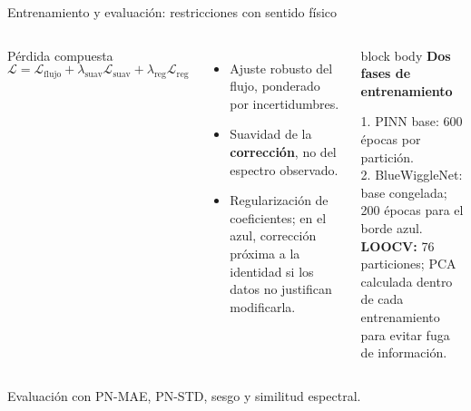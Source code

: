 \documentclass[aspectratio=169,10pt]{beamer}
\begin{document}
\begin{frame}{Entrenamiento y evaluación: restricciones con sentido físico}
  \begin{columns}[T,onlytextwidth]
      \begin{block}{Pérdida compuesta}
        \[
          \mathcal{L}=
          \mathcal{L}_{\mathrm{flujo}}+
          \lambda_{\mathrm{suav}}\mathcal{L}_{\mathrm{suav}}+
          \lambda_{\mathrm{reg}}\mathcal{L}_{\mathrm{reg}}
        \]
      \end{block}
      \begin{itemize}
        \item Ajuste robusto del flujo, ponderado por incertidumbres.
        \item Suavidad de la \textbf{corrección}, no del espectro observado.
        \item Regularización de coeficientes; en el azul, corrección próxima a
              la identidad si los datos no justifican modificarla.
      \end{itemize}
      \begin{beamercolorbox}[wd=\linewidth,sep=0.85em,rounded=true]{block body}
        {\color{ULLNavy}\bfseries Dos fases de entrenamiento}\par
        \small
        1. PINN base: 600 épocas por partición.\\[0.35em]
        2. BlueWiggleNet: base congelada; 200 épocas para el borde azul.\\[0.55em]
        \textbf{LOOCV:} 76 particiones; PCA calculada dentro de cada
        entrenamiento para evitar fuga de información.
      \end{beamercolorbox}
  \end{columns}
  \vspace{0.2em}
  {\scriptsize\color{Muted}Evaluación con PN-MAE, PN-STD, sesgo y similitud espectral.}
\end{frame}
\end{document}
